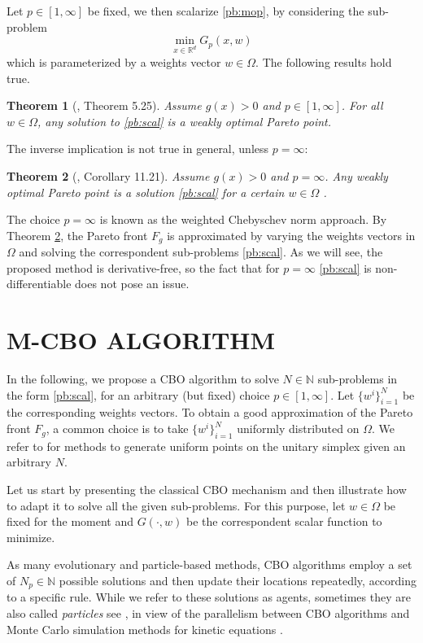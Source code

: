 \documentclass[letterpaper, 10 pt, conference]{ieeeconf}  %
\newtheorem{theorem}{Theorem}
\begin{document}
Let $p \in [1,\infty]$ be fixed, we then scalarize \eqref{pb:mop}, by considering the sub-problem
\begin{equation}
\min_{x \in \mathbb{R}^d} G_p(x, w)
\label{pb:scal}
\end{equation} 
which is parameterized by a weights vector $w \in \Omega$. The following results hold true.

\begin{theorem}[\cite{jahn2004vector}, Theorem 5.25]
\label{t:1}
Assume $g(x) > 0$ and $p\in[1,\infty]$. For all $w \in \Omega$, any solution to \eqref{pb:scal} is a weakly optimal Pareto point.
\end{theorem}
The inverse implication is not true in general, unless $p=\infty$:
\begin{theorem}[\cite{jahn2004vector}, Corollary 11.21]
Assume $g(x) > 0$ and $p=\infty$. Any weakly optimal Pareto point is a solution \eqref{pb:scal} for a certain $w \in \Omega$ .
\label{t:2}
\end{theorem}

The choice $p=\infty$ is known as the weighted Chebyschev norm approach. By Theorem \ref{t:2}, the Pareto front $F_g$ is approximated by varying the weights vectors in $\Omega$ and solving the correspondent sub-problems \eqref{pb:scal}.  As we will see, the proposed method is derivative-free, so the fact that for $p=\infty$ \eqref{pb:scal} is non-differentiable does not pose an issue. 

\section{M-CBO ALGORITHM}
\label{s:3}

In the following, we propose a CBO algorithm to solve $N \in \mathbb{N}$ sub-problems in the form \eqref{pb:scal}, for an arbitrary (but fixed) choice $p \in [1, \infty]$. Let $\{ w^i\}_{i=1}^N$ be the corresponding weights vectors. To obtain a good approximation of the Pareto front $F_g$, a common choice is to take $\{ w^i\}_{i=1}^N$ uniformly distributed on $\Omega$. We refer to \cite{deb2019generating} for methods to generate uniform points on the unitary simplex given an arbitrary $N$.

Let us start by presenting the classical CBO mechanism and then illustrate how to adapt it to solve all the given sub-problems. 
For this purpose, let $w\in \Omega$ be fixed for the moment and $G(\cdot, w)$ be the correspondent scalar function to minimize.  

As many evolutionary and particle-based methods, CBO algorithms employ a set of $N_p \in \mathbb{N}$ possible solutions and then update their locations repeatedly, according to a specific rule. While we refer to these solutions as agents, sometimes they are also called \textit{particles} see \cite{pinnau2017consensus, carrillo2019consensus}, in view of the parallelism between CBO algorithms and Monte Carlo simulation methods for kinetic equations \cite{pareschi13}. 
\end{document}
